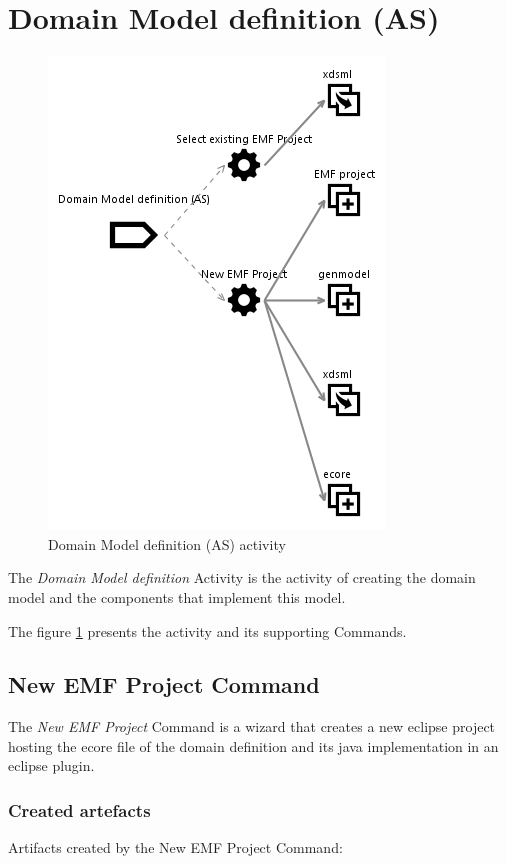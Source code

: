 \documentclass{gemoc} %
\begin{document}
\section{Domain Model definition (AS)}
\label{sec:Domain_Model_definition_(AS)}
\begin{figure}[h]
		\center
		\includegraphics*[trim=0.0cm 0.0cm 0cm 0.0cm, clip=true]{fig/Domain_Model_definition_(AS)}
		\caption{Domain Model definition (AS) activity}
		\label{fig:Domain_Model_definition_(AS)}
\end{figure}

The \emph{Domain Model definition} Activity is the activity of creating the domain model and the components that implement this model.

The figure \ref{fig:Domain_Model_definition_(AS)} presents the activity and its supporting Commands.

\subsection{New EMF Project Command}
The \emph{New EMF Project} Command is a wizard that creates a new eclipse project hosting the ecore file of the domain definition and its java implementation in an eclipse plugin.
\subsubsection{Created artefacts}
Artifacts created by the New EMF Project Command:
\end{document}
